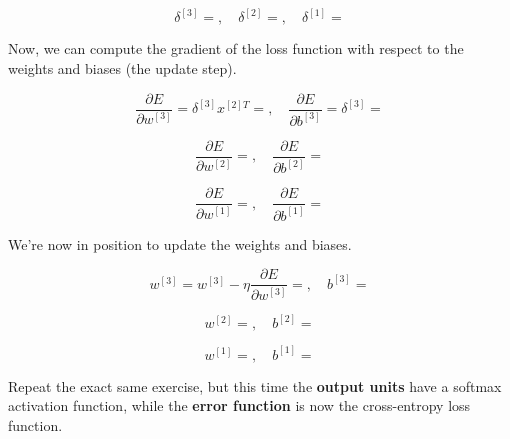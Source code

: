 \documentclass[12pt]{article}
\begin{document}
\begin{enumerate}[leftmargin=\labelsep]
  \begin{equation*}
    \delta^{[3]} = , \quad
    \delta^{[2]} = , \quad
    \delta^{[1]} = 
  \end{equation*}

  Now, we can compute the gradient of the loss function with respect to the
  weights and biases (the update step).

  \begin{equation*}
    \frac{\partial E}{\partial w^{[3]}} = \delta^{[3]} x^{[2]T} = , \quad
    \frac{\partial E}{\partial b^{[3]}} = \delta^{[3]}  = 
  \end{equation*}

  \begin{equation*}
    \frac{\partial E}{\partial w^{[2]}} = , \quad
    \frac{\partial E}{\partial b^{[2]}} = 
  \end{equation*}

  \begin{equation*}
    \frac{\partial E}{\partial w^{[1]}} = , \quad
    \frac{\partial E}{\partial b^{[1]}} = 
  \end{equation*}

  We're now in position to update the weights and biases.

  \begin{equation*}
    w^{[3]} = w^{[3]} - \eta \frac{\partial E}{\partial w^{[3]}} = , \quad
    b^{[3]} = 
  \end{equation*}

  \begin{equation*}
    w^{[2]} = , \quad
    b^{[2]} = 
  \end{equation*}

  \begin{equation*}
    w^{[1]} = , \quad
    b^{[1]} = 
  \end{equation*}

  \begin{tcolorbox}[enhanced jigsaw,colback=bg,boxrule=0pt,arc=1pt,halign=center]
    \item Repeat the exact same exercise, but this time the \textbf{output units}
    have a softmax activation function, while the \textbf{error function} is now
    the cross-entropy loss function.


\end{tcolorbox}
\end{enumerate}
\end{document}
